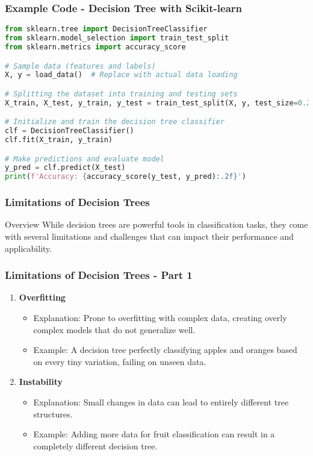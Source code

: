 \documentclass[aspectratio=169]{beamer}
\begin{document}
\begin{frame}[fragile]
    \frametitle{Example Code - Decision Tree with Scikit-learn}
    \begin{lstlisting}[language=Python]
from sklearn.tree import DecisionTreeClassifier
from sklearn.model_selection import train_test_split
from sklearn.metrics import accuracy_score

# Sample data (features and labels)
X, y = load_data()  # Replace with actual data loading

# Splitting the dataset into training and testing sets
X_train, X_test, y_train, y_test = train_test_split(X, y, test_size=0.2, random_state=42)

# Initialize and train the decision tree classifier
clf = DecisionTreeClassifier()
clf.fit(X_train, y_train)

# Make predictions and evaluate model
y_pred = clf.predict(X_test)
print(f'Accuracy: {accuracy_score(y_test, y_pred):.2f}')
    \end{lstlisting}
\end{frame}

\begin{frame}[fragile]
    \frametitle{Limitations of Decision Trees}
    \begin{block}{Overview}
        While decision trees are powerful tools in classification tasks, they come with several limitations and challenges that can impact their performance and applicability.
    \end{block}
\end{frame}

\begin{frame}[fragile]
    \frametitle{Limitations of Decision Trees - Part 1}
    \begin{enumerate}
        \item \textbf{Overfitting}
        \begin{itemize}
            \item Explanation: Prone to overfitting with complex data, creating overly complex models that do not generalize well.
            \item Example: A decision tree perfectly classifying apples and oranges based on every tiny variation, failing on unseen data.
        \end{itemize}

        \item \textbf{Instability}
        \begin{itemize}
            \item Explanation: Small changes in data can lead to entirely different tree structures.
            \item Example: Adding more data for fruit classification can result in a completely different decision tree.
        \end{itemize}
    \end{enumerate}
\end{frame}
\end{document}
